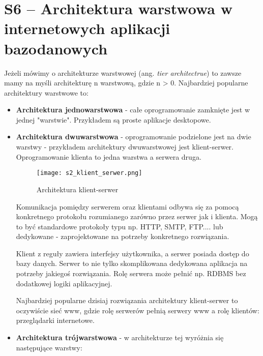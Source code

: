 \section{S6 -- Architektura warstwowa w internetowych aplikacji bazodanowych}

Jeżeli mówimy o architekturze warstwowej (ang. \textit{tier architectrue}) to zawsze mamy na myśli architekturę n warstwową, gdzie n > 0. Najbardziej popularne architektury warstwowe to:

\begin{itemize}
	\setlength\itemsep{1pt}
	\item \textbf{Architektura jednowarstwowa} - całe oprogramowanie zamknięte jest w jednej "warstwie". Przykładem są proste aplikacje desktopowe.
	\item \textbf{Architektura dwuwarstwowa} - oprogramowanie podzielone jest na dwie warstwy - przykładem architektury dwuwarstwowej jest klient-serwer. Oprogramowanie klienta to jedna warstwa a serwera druga. 
	
	\begin{figure}[H]
		\centering
		\texttt{[image: s2\_klient\_serwer.png]}
		\caption{Architektura klient-serwer}
	\end{figure}
	
	Komunikacja pomiędzy serwerem oraz klientami odbywa się za pomocą konkretnego protokołu rozumianego zarówno przez serwer jak i klienta. Mogą to być standardowe protokoły typu np. HTTP, SMTP, FTP.... lub dedykowane - zaprojektowane na potrzeby konkretnego rozwiązania.
	
	Klient z reguły zawiera interfejsy użytkownika, a serwer posiada dostęp do bazy danych. Serwer to nie tylko skomplikowana dedykowana aplikacja na potrzeby jakiegoś rozwiązania. Rolę serwera może pełnić np. RDBMS bez dodatkowej logiki aplikacyjnej.
	
	Najbardziej popularne dzisiaj rozwiązania architektury klient-serwer to oczywiście sieć www, gdzie rolę serwerów pełnią serwery www a rolę klientów: przeglądarki internetowe.
	\item \textbf{Architektura trójwarstwowa} - w architekturze tej wyróżnia się następujące warstwy:
	

\end{itemize}
